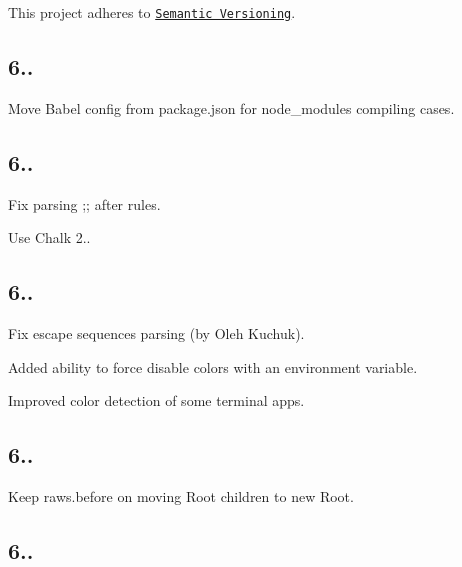 This project adheres to \href{http://semver.org/}{\tt Semantic Versioning}.

\subsection*{6..}


\begin{DoxyItemize}
\item Move Babel config from {\ttfamily package.\+json} for {\ttfamily node\+\_\+modules} compiling cases.
\end{DoxyItemize}

\subsection*{6..}


\begin{DoxyItemize}
\item Fix parsing {\ttfamily ;;} after rules.
\item Use Chalk 2..
\end{DoxyItemize}

\subsection*{6..}


\begin{DoxyItemize}
\item Fix escape sequences parsing (by Oleh Kuchuk).
\item Added ability to force disable colors with an environment variable.
\item Improved color detection of some terminal apps.
\end{DoxyItemize}

\subsection*{6..}


\begin{DoxyItemize}
\item Keep {\ttfamily raws.\+before} on moving {\ttfamily Root} children to new {\ttfamily Root}.
\end{DoxyItemize}

\subsection*{6..}


